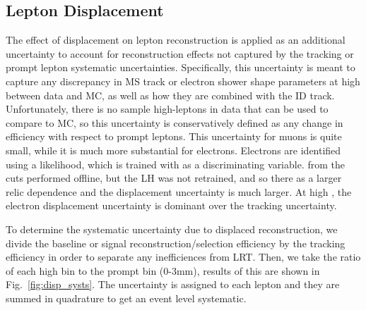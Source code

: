 \subsection{Lepton Displacement}

The effect of displacement on lepton reconstruction is applied as an additional uncertainty to account for reconstruction effects not captured by the tracking or prompt lepton systematic uncertainties. Specifically, this uncertainty is meant to capture any discrepancy in MS track or electron shower shape parameters at high \absdz between data and MC, as well as how they are combined with the ID track. Unfortunately, there is no sample high-\absdz leptons in data that can be used to compare to MC, so this uncertainty is conservatively defined as any change in efficiency with respect to prompt leptons. This uncertainty for muons is quite small, while it is much more substantial for electrons. Electrons are identified using a likelihood, which is trained with \dz as a discriminating variable. \absdz from the cuts performed offline, but the LH was not retrained, and so there as a larger relic \dz dependence and the displacement uncertainty is much larger. At high \absdz, the electron displacement uncertainty is dominant over the tracking uncertainty.

To determine the systematic uncertainty due to displaced reconstruction, we divide the baseline or signal reconstruction/selection efficiency by the tracking efficiency in order to separate any inefficiences from LRT. Then, we take the ratio of each high \dz bin to the prompt bin (0-3mm), results of this are shown in Fig.~\ref{fig:disp_systs}. The uncertainty is assigned to each lepton and they are summed in quadrature to get an event level systematic. 

